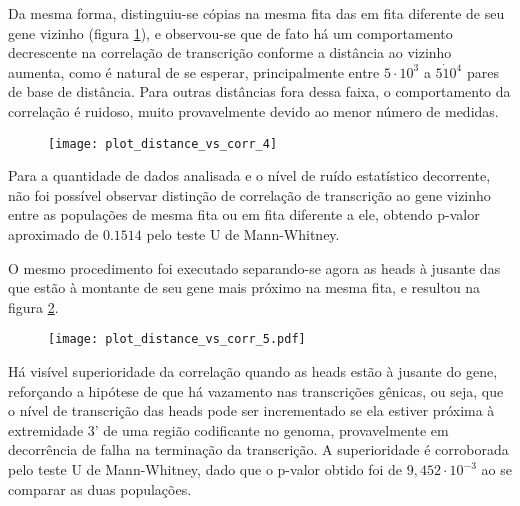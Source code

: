 \documentclass{article}
\begin{document}
\begin{multicols}{2}
Da mesma forma, distinguiu-se cópias na mesma fita das em fita diferente de seu gene vizinho (figura \ref{samediffstrand}), e observou-se que de fato há um comportamento decrescente na correlação de transcrição conforme a distância ao vizinho aumenta, como é natural de se esperar, principalmente entre \(5 \cdot 10^3\) a \(5 \dot 10^4\) pares de base de distância. Para outras distâncias fora dessa faixa, o comportamento da correlação é ruidoso, muito provavelmente devido ao menor número de medidas.

\begin{figure}[H]
	\centering
	\label{samediffstrand}
	\texttt{[image: plot\_distance\_vs\_corr\_4]}
\end{figure}

Para a quantidade de dados analisada e o nível de ruído estatístico decorrente, não foi possível observar distinção de correlação de transcrição ao gene vizinho entre as populações de mesma fita ou em fita diferente a ele, obtendo p-valor aproximado de \(0.1514\) pelo teste U de Mann-Whitney.

O mesmo procedimento foi executado separando-se agora as heads à jusante das que estão à montante de seu gene mais próximo na mesma fita, e resultou na figura \ref{updownstream}.

\begin{figure}[H]
	\centering
	\label{updownstream}
	\texttt{[image: plot\_distance\_vs\_corr\_5.pdf]}
\end{figure}

Há visível superioridade da correlação quando as heads estão à jusante do gene, reforçando a hipótese de que há vazamento nas transcrições gênicas, ou seja, que o nível de transcrição das heads pode ser incrementado se ela estiver próxima à extremidade 3' de uma região codificante no genoma, provavelmente em decorrência de falha na terminação da transcrição. A superioridade é corroborada pelo teste U de Mann-Whitney, dado que o p-valor obtido foi de \(9,452 \cdot 10^{-3}\) ao se comparar as duas populações.

\end{multicols}
\end{document}
